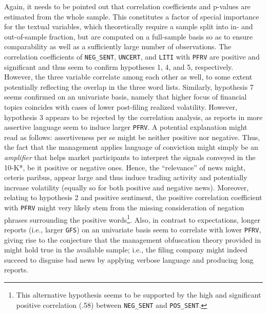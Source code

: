 Again, it needs to be pointed out that correlation coefficients and p-values are estimated from the whole sample. This constitutes a factor of special importance for the textual variables, which theoretically require a sample split into in- and out-of-sample fraction, but are computed on a full-sample basis so as to ensure comparability as well as a sufficiently large number of observations. The correlation coefficients of \texttt{NEG\_SENT}, \texttt{UNCERT}, and \texttt{LITI} with \texttt{PFRV} are positive and significant and thus seem to confirm hypotheses 1, 4, and 5, respectively. However, the three variable correlate among each other as well, to some extent potentially reflecting the overlap in the three word lists. Similarly, hypothesis 7 seems confirmed on an univariate basis, namely that higher focus of financial topics coincides with cases of lower post-filing realized volatility. However, hypothesis 3 appears to be rejected by the correlation analysis, as reports in more assertive language seem to induce larger \texttt{PFRV}. A potential explanation might read as follows: assertiveness per se might be neither positive nor negative. Thus, the fact that the management applies language of conviction might simply be an \textit{amplifier} that helps market participants to interpret the signals conveyed in the 10-K*, be it positive or negative ones. Hence, the \enquote{relevance} of news might, ceteris paribus, appear large and thus induce trading activity and potentially increase volatility (equally so for both positive and negative news). Moreover, relating to hypothesis 2 and positive sentiment, the positive correlation coefficient with \texttt{PFRV} might very likely stem from the missing consideration of negation phrases surrounding the positive words\footnote{This alternative hypothesis seems to be supported by the high and significant positive correlation (.58) between \texttt{NEG\_SENT} and \texttt{POS\_SENT}.}. Also, in contrast to expectations, longer reports (i.e., larger \texttt{GFS}) on an univariate basis seem to correlate with lower \texttt{PFRV}, giving rise to the conjecture that the management obfuscation theory provided in \textcite{Li2008} might hold true in the available sample; i.e., the filing company might indeed succeed to disguise bad news by applying verbose language and producing long reports.

